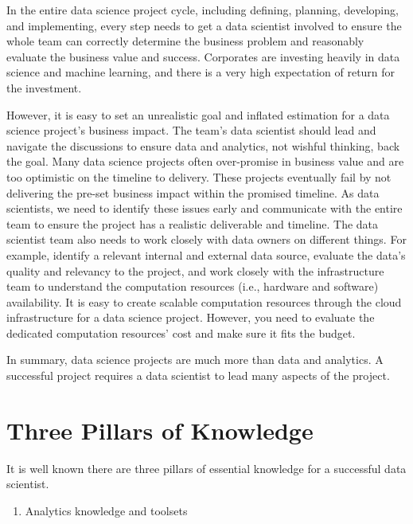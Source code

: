 \documentclass[12pt,]{krantz}
\providecommand{\tightlist}{%
  \setlength{\itemsep}{0pt}\setlength{\parskip}{0pt}}
\begin{document}
In the entire data science project cycle, including defining, planning, developing, and implementing, every step needs to get a data scientist involved to ensure the whole team can correctly determine the business problem and reasonably evaluate the business value and success. Corporates are investing heavily in data science and machine learning, and there is a very high expectation of return for the investment.

However, it is easy to set an unrealistic goal and inflated estimation for a data science project's business impact. The team's data scientist should lead and navigate the discussions to ensure data and analytics, not wishful thinking, back the goal. Many data science projects often over-promise in business value and are too optimistic on the timeline to delivery. These projects eventually fail by not delivering the pre-set business impact within the promised timeline. As data scientists, we need to identify these issues early and communicate with the entire team to ensure the project has a realistic deliverable and timeline. The data scientist team also needs to work closely with data owners on different things. For example, identify a relevant internal and external data source, evaluate the data's quality and relevancy to the project, and work closely with the infrastructure team to understand the computation resources (i.e., hardware and software) availability. It is easy to create scalable computation resources through the cloud infrastructure for a data science project. However, you need to evaluate the dedicated computation resources' cost and make sure it fits the budget.

In summary, data science projects are much more than data and analytics. A successful project requires a data scientist to lead many aspects of the project.

\hypertarget{three-pillars-of-knowledge}{%
\section{Three Pillars of Knowledge}\label{three-pillars-of-knowledge}}

It is well known there are three pillars of essential knowledge for a successful data scientist.

\begin{enumerate}
\def\labelenumi{(\arabic{enumi})}
\tightlist
\item
  Analytics knowledge and toolsets
\end{enumerate}
\end{document}
